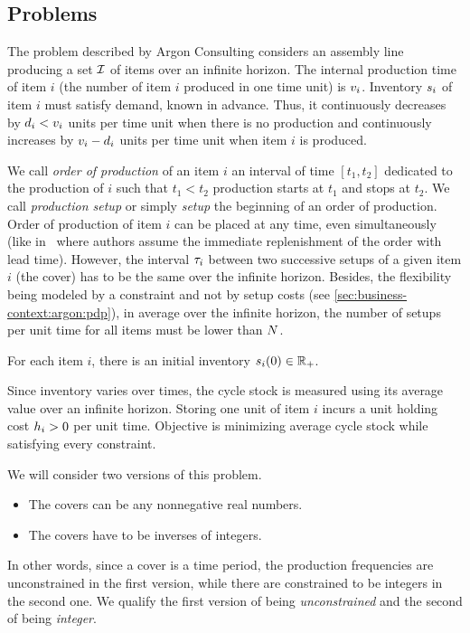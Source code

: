 \subsection{Problems}

The problem described by Argon Consulting considers an assembly line producing a set $\mathcal{I}$ of items over an infinite horizon.
The internal production time of item $i$ (\ie the number of item $i$ produced in one time unit) is $v_i$.
Inventory $s_i$ of item $i$ must satisfy demand, known in advance.
Thus, it continuously decreases by $d_i<v_i$ units per time unit when there is no production and continuously increases by $v_i-d_i$ units per time unit when item $i$ is produced.


We call \emph{order of production} of an item $i$ an interval of time $[t_1,t_2]$ dedicated to the production of $i$ such that $t_1<t_2$ production starts at $t_1$ and stops at $t_2$.
We call \emph{production setup} or simply \emph{setup} the beginning of an order of production.
Order of production of item $i$ can be placed at any time, even simultaneously (like in~\cite{Ohno2001} where authors assume the immediate replenishment of the order with lead time).
However, the interval $\tau_i$ between two successive setups of a given item $i$ (\ie the cover) has to be the same over the infinite horizon.
Besides, the flexibility being modeled by a constraint and not by setup costs (see \cref{sec:business-context:argon:pdp}), in average over the infinite horizon, the number of setups per unit time for all items must be lower than $N$.


For each item $i$, there is an initial inventory $s_i\bracket{0}\in\RR_+$.


Since inventory varies over times, the cycle stock is measured using its average value over an infinite horizon.
Storing one unit of item $i$ incurs a unit holding cost $h_i>0$ per unit time.
Objective is minimizing average cycle stock while satisfying every constraint.


\medskip


We will consider two versions of this problem.
\begin{itemize}
  \item The covers can be any nonnegative real numbers.
  \item The covers have to be inverses of integers.
\end{itemize}
In other words, since a cover is a time period, the production frequencies are unconstrained in the first version, while there are constrained to be integers in the second one. We qualify the first version of being {\em unconstrained} and the second of being {\em integer}.





